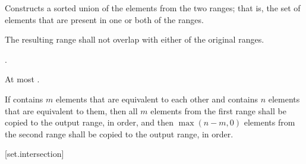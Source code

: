 \begin{itemdescr}
\pnum
\effects
Constructs a sorted union of the elements from the two ranges;
that is, the set of elements that are present in one or both of the ranges.

\pnum
\requires
The resulting range shall not overlap with either of the original ranges.

\pnum
\returns
{}
.

\pnum
\complexity
At most
.

\pnum
\notes If  contains $m$ elements that are equivalent to
each other and  contains $n$ elements that are equivalent
to them, then all $m$ elements from the first range shall be copied to the output
range, in order, and then $\max(n - m, 0)$ elements from the second range shall
be copied to the output range, in order.
\end{itemdescr}

[set.intersection]{}

